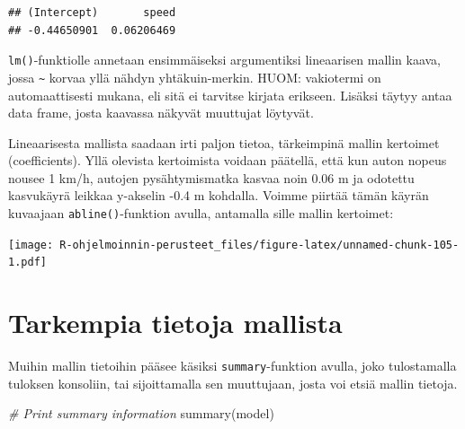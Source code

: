 \documentclass[
]{book}
\newenvironment{Shaded}{\begin{snugshade}}{\end{snugshade}}
\newcommand{\AttributeTok}[1]{\textcolor[rgb]{0.77,0.63,0.00}{#1}}
\newcommand{\CommentTok}[1]{\textcolor[rgb]{0.56,0.35,0.01}{\textit{#1}}}
\newcommand{\DecValTok}[1]{\textcolor[rgb]{0.00,0.00,0.81}{#1}}
\newcommand{\FunctionTok}[1]{\textcolor[rgb]{0.00,0.00,0.00}{#1}}
\newcommand{\NormalTok}[1]{#1}
\newcommand{\SpecialCharTok}[1]{\textcolor[rgb]{0.00,0.00,0.00}{#1}}
\newcommand{\StringTok}[1]{\textcolor[rgb]{0.31,0.60,0.02}{#1}}
\begin{document}
\begin{verbatim}
## (Intercept)       speed 
## -0.44650901  0.06206469
\end{verbatim}

\texttt{lm()}-funktiolle annetaan ensimmäiseksi argumentiksi lineaarisen mallin kaava, jossa \texttt{\textasciitilde{}} korvaa yllä nähdyn yhtäkuin-merkin. HUOM: vakiotermi on automaattisesti mukana, eli sitä ei tarvitse kirjata erikseen. Lisäksi täytyy antaa data frame, josta kaavassa näkyvät muuttujat löytyvät.

Lineaarisesta mallista saadaan irti paljon tietoa, tärkeimpinä mallin kertoimet (coefficients). Yllä olevista kertoimista voidaan päätellä, että kun auton nopeus nousee 1 km/h, autojen pysähtymismatka kasvaa noin 0.06 m ja odotettu kasvukäyrä leikkaa y-akselin -0.4 m kohdalla. Voimme piirtää tämän käyrän kuvaajaan \texttt{abline()}-funktion avulla, antamalla sille mallin kertoimet:

\begin{Shaded}
\end{Shaded}

\texttt{[image: R-ohjelmoinnin-perusteet\_files/figure-latex/unnamed-chunk-105-1.pdf]}

\hypertarget{tarkempia-tietoja-mallista}{%
\section{Tarkempia tietoja mallista}\label{tarkempia-tietoja-mallista}}

Muihin mallin tietoihin pääsee käsiksi \texttt{summary}-funktion avulla, joko tulostamalla tuloksen konsoliin, tai sijoittamalla sen muuttujaan, josta voi etsiä mallin tietoja.

\begin{Shaded}
\begin{Highlighting}[]
\CommentTok{\# Print summary information}
\FunctionTok{summary}\NormalTok{(model)}
\end{Highlighting}
\end{Shaded}
\end{document}
